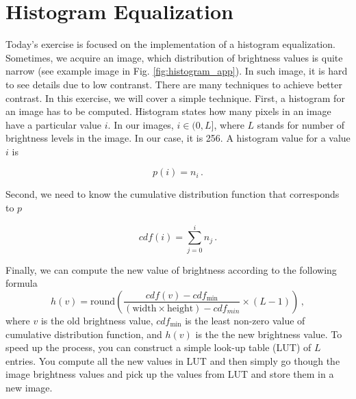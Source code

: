 \documentclass[12pt]{article}
\begin{document}
\section*{Histogram Equalization}

\noindent
Today's exercise is focused on the implementation of a histogram equalization.
\newline
\newline
\noindent
Sometimes, we acquire an image, which distribution of brightness values is quite narrow
(see example image in Fig. \ref{fig:histogram_app}).
In such image, it is hard to see details due to low contranst.
There are many techniques to achieve better contrast. In this exercise, we will cover
a simple technique.
\newline
\newline
\noindent
First, a histogram for an image has to be computed. Histogram states how many pixels in an image
have a particular value $i$. In our images, $i \in ( 0, L ]$, where $L$ stands for number of
brightness levels in the image. In our case, it is 256. A histogram value
for a value $i$ is %

\begin{equation} \label{eq:histogram}
    p(i) = n_i \, .
\end{equation}

\noindent
Second, we need to know the cumulative distribution function that corresponds to $p$

\begin{equation} \label{eq:cdf}
    cdf(i) = \sum\limits_{j=0}^{i} n_j \, .
\end{equation}

\noindent
Finally, we can compute the new value of brightness according to the following formula
\begin{equation}
    h(v) = \text{round} \left( \frac{cdf(v) - cdf_{\min}}{ \left( \text{width} \times \text{height} \right) - cdf_{min} } \times \left(L - 1\right) \right) \, ,
\end{equation}
where $v$ is the old brightness value, $cdf_{\min}$ is the least non-zero value of cumulative distribution function, and $h(v)$
is the the new brightness value.
\newline
\newline
\noindent
To speed up the process, you can construct a simple look-up table (LUT) of $L$ entries. You compute all the new values
in LUT and then simply go though the image brightness values and pick up the values from LUT and store them in a new image.
\end{document}
